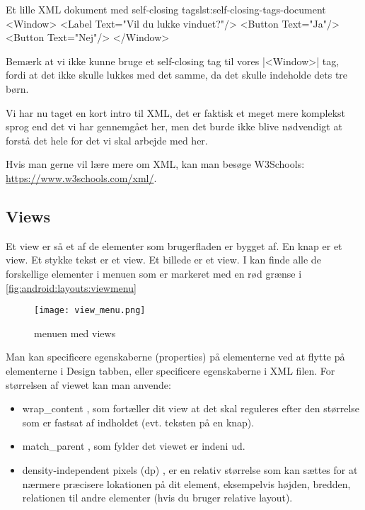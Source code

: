\begin{example}
	\begin{XmlCode}{Et lille XML dokument med self-closing tags}{lst:self-closing-tags-document}
		<Window>
			<Label Text="Vil du lukke vinduet?"/>
			<Button Text="Ja"/>
			<Button Text="Nej"/>
		</Window>
	\end{XmlCode}
\end{example}

\begin{remark}
	Bemærk at vi ikke kunne bruge et self-closing tag til vores \XmlInline|<Window>| tag, fordi at det ikke skulle lukkes med det samme, da det skulle indeholde dets tre børn.
\end{remark}

Vi har nu taget en kort intro til XML, det er faktisk et meget mere komplekst sprog end det vi har gennemgået her, men det burde ikke blive nødvendigt at forstå det hele for det vi skal arbejde med her.

Hvis man gerne vil lære mere om XML, kan man besøge W3Schools: \url{https://www.w3schools.com/xml/}.

\subsection{Views}
Et view er så et af de elementer som brugerfladen er bygget af. En knap er et view. Et stykke tekst er et view. Et billede er et view. I kan finde alle de forskellige elementer i menuen som er markeret med en rød grænse i \autoref{fig:android:layouts:viewmenu}

\begin{figure}[h]
	\begin{center}
		\texttt{[image: view\_menu.png]}
		\caption{menuen med views}
		\label{fig:android:layouts:viewmenu}
	\end{center}
\end{figure}

Man kan specificere egenskaberne (properties) på elementerne ved at flytte på elementerne i Design tabben, eller specificere egenskaberne i XML filen. For størrelsen af viewet kan man anvende:
\begin{itemize}
	\item wrap\_content , som fortæller dit view at det skal reguleres efter den størrelse som er fastsat af indholdet (evt. teksten på en knap).
	\item match\_parent , som fylder det viewet er indeni ud.\\
	\item density-independent pixels (dp) , er en relativ størrelse som kan sættes for at nærmere præcisere lokationen på dit element, eksempelvis højden, bredden, relationen til andre elementer (hvis du bruger relative layout).
\end{itemize}

